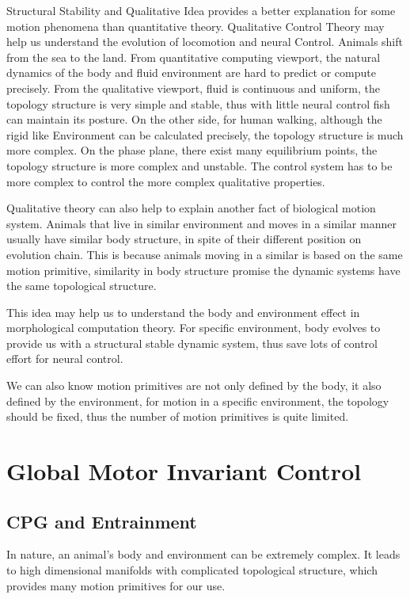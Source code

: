 Structural Stability and Qualitative Idea provides a better explanation for some motion phenomena than quantitative theory.
Qualitative Control Theory may help us understand the evolution of locomotion and neural Control.
Animals shift from the sea to the land. From quantitative computing viewport, the natural dynamics of the body and fluid environment are hard to predict or compute precisely. From the qualitative viewport, fluid is continuous
and uniform, the topology structure is very simple and stable, thus with little neural control fish can maintain its posture. On the other side, for human walking, although the rigid like
Environment can be calculated precisely, the topology structure is much more complex. On
the phase plane, there exist many equilibrium points, the topology structure is more complex and unstable. The control system has to be more complex to control the more complex qualitative properties.

Qualitative theory can also help to explain another fact of biological motion system. Animals that live in similar environment and moves in a similar manner usually have similar body structure, in spite of their different position on evolution chain. This is because animals moving in a similar is based on the same motion primitive, similarity in body structure promise the dynamic systems have the same topological structure.

This idea may help us to understand the body and environment effect in morphological computation theory. 
For specific environment, body evolves to provide us with a structural stable dynamic system, thus save lots of control effort for neural control.

We can also know motion primitives are not only defined by the body, it also defined by the environment, for motion in a specific environment, the topology should be fixed, thus the number of motion primitives is quite limited.


\section{Global Motor Invariant Control}
\subsection{CPG and Entrainment}
In nature, an animal's body and environment can be extremely complex. 
It leads to high dimensional manifolds with complicated topological structure, which provides many motion primitives for our use.

